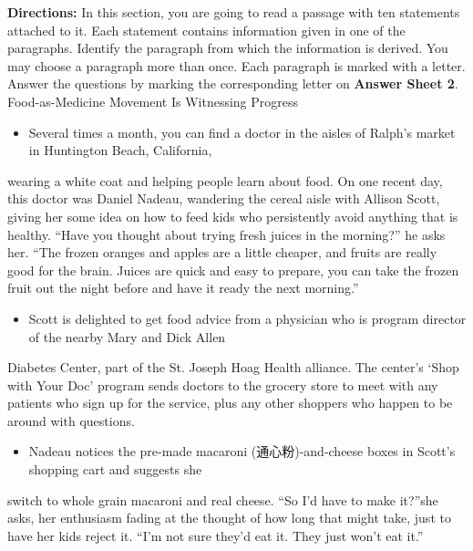 \documentclass[UTF8,11pt]{ctexart}
\begin{document}
\textbf{Directions:} In this section, you are going to read a passage with ten statements attached to it. Each statement contains information given in one of the paragraphs. Identify the paragraph from which the information is derived. You may choose a paragraph more than once. Each paragraph is marked with a letter. Answer the questions by marking the corresponding letter on\textbf{ Answer Sheet 2}. Food-as-Medicine Movement Is Witnessing Progress


\begin{itemize}[leftmargin=2em,itemsep=.2em,topsep=.4em]\item[A.] Several times a month, you can find a doctor in the aisles of Ralph’s market in Huntington Beach, California,
\end{itemize}

wearing a white coat and helping people learn about food. On one recent day, this doctor was Daniel Nadeau, wandering the cereal aisle with Allison Scott, giving her some idea on how to feed kids who persistently avoid anything that is healthy. “Have you thought about trying fresh juices in the morning?” he asks her. “The frozen oranges and apples are a little cheaper, and fruits are really good for the brain. Juices are quick and easy to prepare, you can take the frozen fruit out the night before and have it ready the next morning.”


\begin{itemize}[leftmargin=2em,itemsep=.2em,topsep=.4em]\item[B.] Scott is delighted to get food advice from a physician who is program director of the nearby Mary and Dick Allen
\end{itemize}

Diabetes Center, part of the St. Joseph Hoag Health alliance. The center’s ‘Shop with Your Doc’ program sends doctors to the grocery store to meet with any patients who sign up for the service, plus any other shoppers who happen to be around with questions.


\begin{itemize}[leftmargin=2em,itemsep=.2em,topsep=.4em]\item[C.] Nadeau notices the pre-made macaroni (通心粉)-and-cheese boxes in Scott’s shopping cart and suggests she
\end{itemize}

switch to whole grain macaroni and real cheese. “So I’d have to make it?”she asks, her enthusiasm fading at the thought of how long that might take, just to have her kids reject it. “I’m not sure they’d eat it. They just won’t eat it.”
\end{document}
